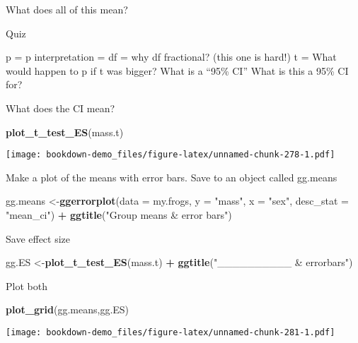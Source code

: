 \documentclass[]{book}
\newenvironment{Shaded}{\begin{snugshade}}{\end{snugshade}}
\newcommand{\KeywordTok}[1]{\textcolor[rgb]{0.13,0.29,0.53}{\textbf{#1}}}
\newcommand{\DataTypeTok}[1]{\textcolor[rgb]{0.13,0.29,0.53}{#1}}
\newcommand{\StringTok}[1]{\textcolor[rgb]{0.31,0.60,0.02}{#1}}
\newcommand{\OperatorTok}[1]{\textcolor[rgb]{0.81,0.36,0.00}{\textbf{#1}}}
\newcommand{\NormalTok}[1]{#1}
\theoremstyle{definition}
\theoremstyle{definition}
\theoremstyle{definition}
\theoremstyle{remark}
\begin{document}
What does all of this mean?

Quiz

p = p interpretation = df = why df fractional? (this one is hard!) t =
What would happen to p if t was bigger? What is a ``95\% CI'' What is
this a 95\% CI for?

What does the CI mean?

\begin{Shaded}
\begin{Highlighting}[]
\KeywordTok{plot_t_test_ES}\NormalTok{(mass.t)}
\end{Highlighting}
\end{Shaded}

\texttt{[image: bookdown-demo\_files/figure-latex/unnamed-chunk-278-1.pdf]}

Make a plot of the means with error bars. Save to an object called
gg.means

\begin{Shaded}
\begin{Highlighting}[]
\NormalTok{gg.means <-}\KeywordTok{ggerrorplot}\NormalTok{(}\DataTypeTok{data =}\NormalTok{ my.frogs,}
          \DataTypeTok{y =} \StringTok{"mass"}\NormalTok{,}
          \DataTypeTok{x =} \StringTok{"sex"}\NormalTok{,}
          \DataTypeTok{desc_stat =} \StringTok{"mean_ci"}\NormalTok{) }\OperatorTok{+}
\StringTok{  }\KeywordTok{ggtitle}\NormalTok{(}\StringTok{"Group means & error bars"}\NormalTok{)}
\end{Highlighting}
\end{Shaded}

Save effect size

\begin{Shaded}
\begin{Highlighting}[]
\NormalTok{gg.ES <-}\KeywordTok{plot_t_test_ES}\NormalTok{(mass.t) }\OperatorTok{+}
\StringTok{  }\KeywordTok{ggtitle}\NormalTok{(}\StringTok{"__________ & errorbars"}\NormalTok{)}
\end{Highlighting}
\end{Shaded}

Plot both

\begin{Shaded}
\begin{Highlighting}[]
\KeywordTok{plot_grid}\NormalTok{(gg.means,gg.ES)}
\end{Highlighting}
\end{Shaded}

\texttt{[image: bookdown-demo\_files/figure-latex/unnamed-chunk-281-1.pdf]}
\end{document}
